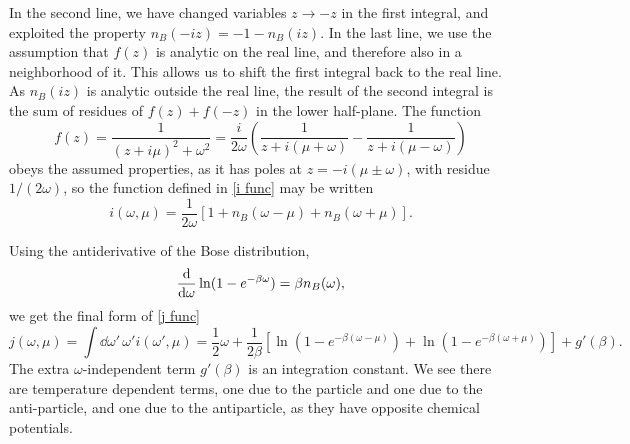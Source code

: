 In the second line, we have changed variables $z \rightarrow -z$ in the first integral, and exploited the property $n_B(-i z) = -1 - n_B(iz)$.
In the last line, we use the assumption that $f(z)$ is analytic on the real line, and therefore also in a neighborhood of it. 
This allows us to shift the first integral back to the real line.
As $n_B(iz)$ is analytic outside the real line, the result of the second integral is the sum of residues of $f(z) + f(-z)$ in the lower half-plane.
The function
%
\begin{equation}
    f(z) 
    = \frac{1}{(z + i \mu)^2 + \omega^2} 
    = \frac{i}{2 \omega } 
    \left(
        \frac{1}{z + i(\mu + \omega)} - \frac{1}{z + i(\mu - \omega)}
    \right)
\end{equation}
%
obeys the assumed properties, as it has poles at
$z = - i (\mu \pm \omega)$, with residue $1 /( 2 \omega)$, so the function defined in \autoref{i func} may be written
%
\begin{equation}
    i(\omega, \mu) 
    = \frac{1}{2\omega}
    [1 + n_B(\omega - \mu) + n_B(\omega + \mu)].
\end{equation}

Using the antiderivative of the Bose distribution,
%
\begin{equation}
    \odv{}{\omega} \ln(1 - e^{-\beta \omega}) = \beta n_B(\omega),
\end{equation}
%
we get the final form of \autoref{j func}
%
\begin{equation}
    j(\omega, \mu) = \int \dd \omega'\, \omega' i(\omega', \mu)
    =  
    \frac{1}{2}\omega + \frac{1}{2\beta} 
    \left[
        \ln\left(1 - e^{-\beta(\omega - \mu)}\right)
        + \ln\left(1 - e^{-\beta(\omega + \mu)}\right)
    \right]
    + g'(\beta).
\end{equation}
%
The extra $\omega$-independent term $g'(\beta)$ is an integration constant.
We see there are temperature dependent terms, one due to the particle and one due to the anti-particle, and one due to the antiparticle, as they have opposite chemical potentials.

